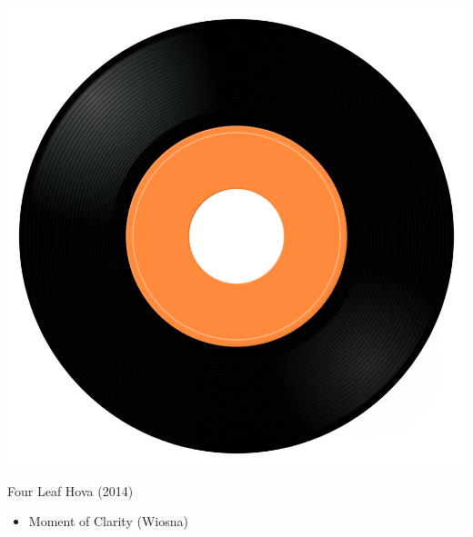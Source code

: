 \begin{minipage}[t]{0.25\textwidth}\vspace{0pt}
	\captionsetup{type=figure}
	\includegraphics[width=\textwidth]{Images/cover.png}
	\caption*{Four Leaf Hova (2014)}
\end{minipage}
\begin{minipage}[t]{0.25\textwidth}\vspace{0pt}
	\begin{itemize}[nosep,leftmargin=1em,labelwidth=*,align=left]
		\setlength{\itemsep}{0pt}
		\item Moment of Clarity (Wiosna)
	\end{itemize}
\end{minipage}
